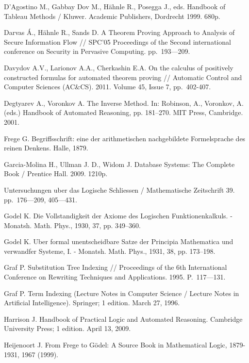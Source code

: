 \begin{thebibliography}{99}
 D'Agostino M., Gabbay Dov M., Hähnle R., Posegga J., eds. Handbook of Tableau Methods /  Kluwer. Academic Publishers, Dordrecht 1999. 680p.

 Darvas Á., Hähnle R., Sands D. A Theorem Proving Approach to Analysis of Secure Information Flow // SPC'05 Proceedings of the Second international conference on Security in Pervasive Computing. pp.~193---209.

 Davydov A.V., Larionov A.A., Cherkashin E.A. On the calculus of positively constructed formulas for automated theorem proving // Automatic Control and Computer Sciences (AC\&CS). 2011. Volume 45, Issue 7, pp.~402-407.

 Degtyarev A., Voronkov A. The Inverse Method. In: Robinson, A., Voronkov, A. (eds.) Handbook of Automated Reasoning, pp. 181--270. MIT Press, Cambridge. 2001.


 Frege G. Begriffsschrift: eine der arithmetischen nachgebildete Formelsprache des reinen Denkens. Halle, 1879.

 Garcia-Molina H., Ullman J. D., Widom J. Database Systems: The Complete Book / Prentice Hall. 2009. 1210p.

 Untersuchungen uber das Logische Schliessen / Mathematische Zeitschrift 39. pp.~176---209, 405---431.


 Godel K. Die Vollstandigkeit der Axiome des Logischen Funktionenkalkuls. - Monatsh. Math. Phys., 1930, 37, pp. 349--360.

 Godel K. Uber formal unentscheidbare Satze der Principia Mathematica und verwandfer Systeme, I. - Monatsh. Math. Phys., 1931, 38, pp. 173--198.



 Graf P. Substitution Tree Indexing // Proceedings of the 6th International Conference on Rewriting Techniques and Applications. 1995. P.~117---131.

 Graf P. Term Indexing (Lecture Notes in Computer Science / Lecture Notes in Artificial Intelligence). Springer; 1 edition. March 27, 1996.

 Harrison J. Handbook of Practical Logic and Automated Reasoning. Cambridge University Press; 1 edition. April 13, 2009.


 Heijenoort J. From Frege to Gödel: A Source Book in Mathematical Logic, 1879-1931, 1967 (1999).


\end{thebibliography}
